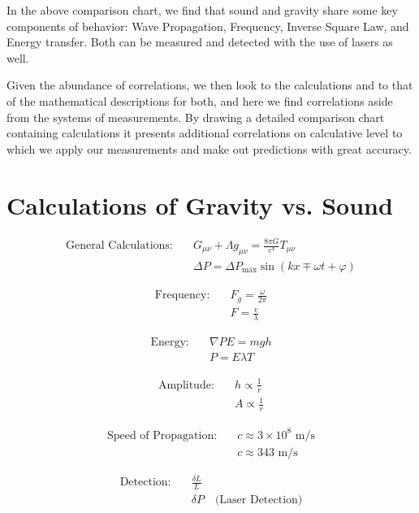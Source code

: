 \documentclass[12pt]{article}
\begin{document}
In the above comparison chart, we find that sound and gravity share some key components of behavior: Wave Propagation, Frequency, Inverse Square Law, and Energy transfer. Both can be measured and detected with the use of lasers as well.

Given the abundance of correlations, we then look to the calculations and to that of the mathematical descriptions for both, and here we find correlations aside from the systems of measurements. By drawing a detailed comparison chart containing calculations it presents additional correlations on calculative level to which we apply our measurements and make out predictions with great accuracy.

\section*{Calculations of Gravity vs. Sound}

\begin{align*}
\text{General Calculations:} \quad & G_{\mu\nu} + \Lambda g_{\mu\nu} = \frac{8 \pi G}{c^4} T_{\mu\nu} \\
& \Delta P = \Delta P_{\max} \sin(kx \mp \omega t + \varphi)
\end{align*}

\begin{align*}
\text{Frequency:} \quad & F_g = \frac{\omega}{2\pi} \\
& F = \frac{v}{\lambda}
\end{align*}

\begin{align*}
\text{Energy:} \quad & \nabla P E = mgh \\
& P = E \lambda T
\end{align*}

\begin{align*}
\text{Amplitude:} \quad & h \propto \frac{1}{r} \\
& A \propto \frac{1}{r}
\end{align*}

\begin{align*}
\text{Speed of Propagation:} \quad & c \approx 3 \times 10^{8} \text{ m/s} \\
& c \approx 343 \text{ m/s}
\end{align*}

\begin{align*}
\text{Detection:} \quad & \frac{\delta L}{L} \\
& \delta P \quad \text{(Laser Detection)}
\end{align*}
\end{document}
